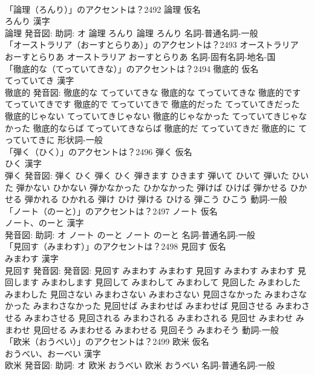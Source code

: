 \documentclass[8pt]{extreport}
\begin{document}
\begin{CJK}{UTF8}{min}
\\	「論理（ろんり）」のアクセントは？2492	論理 仮名　
\\	ろんり 漢字　
\\	論理 発音図: 助詞: オ	論理 ろんり		論理 ろんり				名詞-普通名詞-一般 
\\	「オーストラリア（おーすとらりあ）」のアクセントは？2493		オーストラリア おーすとらりあ		オーストラリア おーすとらりあ				名詞-固有名詞-地名-国 
\\	「徹底的な（てっていてきな）」のアクセントは？2494	徹底的 仮名　
\\	てっていてき 漢字　
\\	徹底的 発音図:	徹底的な てっていてきな		徹底的な てっていてきな 徹底的です てっていてきです 徹底的で てっていてきで 徹底的だった てっていてきだった 徹底的じゃない てっていてきじゃない 徹底的じゃなかった てっていてきじゃなかった 徹底的ならば てっていてきならば 徹底的だ てっていてきだ 徹底的に てっていてきに				形状詞-一般 
\\	「弾く（ひく）」のアクセントは？2496	弾く 仮名　
\\	ひく 漢字　
\\	弾く 発音図:	弾く ひく		弾く ひく 弾きます ひきます 弾いて ひいて 弾いた ひいた 弾かない ひかない 弾かなかった ひかなかった 弾けば ひけば 弾かせる ひかせる 弾かれる ひかれる 弾け ひけ 弾ける ひける 弾こう ひこう				動詞-一般 
\\	「ノート（のーと）」のアクセントは？2497	ノート 仮名　
\\	ノート、のーと 漢字　
\\	発音図: 助詞: オ	ノート のーと		ノート のーと				名詞-普通名詞-一般 
\\	「見回す（みまわす）」のアクセントは？2498	見回す 仮名　
\\	みまわす 漢字　
\\	見回す 発音図: 発音図:	見回す みまわす みまわす		見回す みまわす みまわす 見回します みまわします 見回して みまわして みまわして 見回した みまわした みまわした 見回さない みまわさない みまわさない 見回さなかった みまわさなかった みまわさなかった 見回せば みまわせば みまわせば 見回させる みまわさせる みまわさせる 見回される みまわされる みまわされる 見回せ みまわせ みまわせ 見回せる みまわせる みまわせる 見回そう みまわそう				動詞-一般 
\\	「欧米（おうべい）」のアクセントは？2499	欧米 仮名　
\\	おうべい、おーべい 漢字　
\\	欧米 発音図: 助詞: オ	欧米 おうべい		欧米 おうべい				名詞-普通名詞-一般 

\end{CJK}
\end{document}
